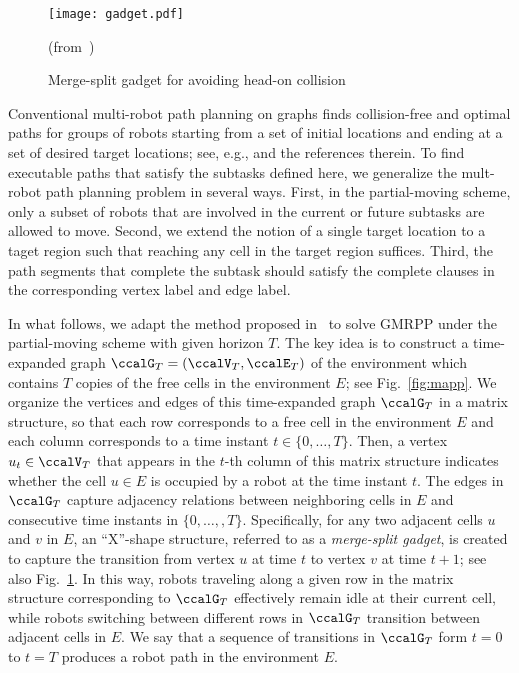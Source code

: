 \documentclass[Afour,sageh,times]{sagej}
\begin{document}
{{\begin{figure}[t]
  \centering
  \texttt{[image: gadget.pdf]}
  \caption{Merge-split gadget for avoiding head-on collision} (from~\cite{yu2016optimal})
  \label{fig:gadget}
\end{figure}
{ Conventional multi-robot path planning on graphs finds collision-free and optimal paths for groups of robots starting from a set of initial locations and ending at a set of desired target locations; see, e.g., \cite{yu2016optimal} and the references therein. To find executable paths that satisfy the subtasks defined here, we generalize the mult-robot path planning problem in several ways. First, in the partial-moving scheme,  only a subset of robots that are involved in the current or future subtasks are allowed to move.  Second, we extend the notion of a single target location to a taget region such that reaching any cell in the target region suffices. Third, the path segments that complete the  subtask should satisfy the complete clauses in the corresponding vertex label and edge label.


  In what follows, we adapt the method proposed in~\cite{yu2016optimal} to solve GMRPP under the partial-moving scheme with given horizon $T$.  The key idea is to construct a time-expanded graph $\ccalG_T = (\ccalV_T, \ccalE_T)$ of the environment which contains $T$ copies of the free cells in the environment $E$; see Fig.~\ref{fig:mapp}. We organize the vertices and edges of this time-expanded graph $\ccalG_T$ in a matrix structure, so that each row corresponds to a free cell in the environment $E$ and each column corresponds to a time instant $t\in \{0,\ldots,T\}$. Then, a vertex $u_t \in \ccalV_T$ that appears in the $t$-th column of this matrix structure indicates whether the cell $u\in E$ is occupied by a robot at the time instant $t$. The edges in $\ccalG_T$ capture  adjacency relations between neighboring cells in $E$ and consecutive time instants in $\{0,\ldots,,T\}$. Specifically, for any two adjacent cells $u$ and $v$ in $E$, an ``X''-shape structure, referred to as a {\it merge-split gadget}, is created to capture the transition from vertex $u$ at time $t$ to vertex $v$ at time $t+1$; see also Fig.~\ref{fig:gadget}. In this way, robots traveling along a given row in the matrix structure corresponding to $\ccalG_T$ effectively remain idle at their current cell, while robots switching between different rows in $\ccalG_T$ transition between adjacent cells in $E$. We say that a sequence of transitions in $\ccalG_T$ form $t=0$ to $t=T$ produces a robot path in the environment $E$.

}}}
\end{document}
